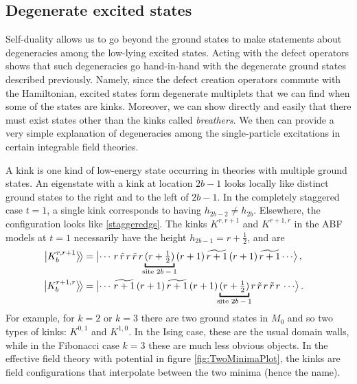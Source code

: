 \subsection{Degenerate excited states}

Self-duality allows us to go beyond the ground states to make statements about degeneracies among the low-lying excited states. Acting with the defect operators shows that such degeneracies go hand-in-hand with the degenerate ground states described previously.
Namely, since the defect creation operators commute with the Hamiltonian, excited states form degenerate multiplets that we can find when some of the states are kinks.
Moreover, we can show directly and easily that there must exist states other than the kinks called {\em breathers}.
We then can provide a very simple explanation of degeneracies among the single-particle excitations in certain integrable field theories.

A kink is one kind of low-energy state occurring in theories with multiple ground states.
An eigenstate with a kink at location $2b-1$ looks locally like distinct ground states to the right and to the left of $2b-1$.
In the completely staggered case $t=1$,  a single kink corresponds to having $h_{2b-2}\ne h_{2b}$. 
Elsewhere, the configuration looks like \eqref{staggeredgs}.
The kinks $K^{r,r+1}$ and $K^{r+1,r}$ in the ABF models at $t=1$ necessarily have the height $h_{2b-1}=r+\frac12$, and are
{\setmuskip{\medmuskip}{0mu}
\begin{align}
	\bigkett{K^{r,r+1}_b} &= \bigket{\cdots \, r \, \tilde{r} \, r \, \tilde{r} \, r \underbracket{ (r+\tfrac12) }_{\mkern-12mu\text{site $2b-1$}\mkern-12mu} \, (r+1) \, \widetilde{r+1} \, (r+1) \, \widetilde{r+1} \cdots} \,,
\cr
	\bigkett{K^{r+1,r}_b} &= \bigket{\cdots \, \widetilde{r+1} \, (r+1) \, \widetilde{r+1} \, (r+1) \underbracket{(r+\tfrac12)}_{\mkern-12mu\text{site $2b-1$}\mkern-12mu} r \, \tilde{r} \, r \, \tilde{r} \, r \, \cdots} \,.
\label{Kdef}
\end{align}}%
For example, for $k=2$ or $k=3$ there are two ground states in $M_0$ and so two types of kinks: $K^{0,1}$ and $K^{1,0}$.
In the Ising case, these are the usual domain walls, while in the Fibonacci case $k=3$ these are much less obvious objects.
In the effective field theory with potential in figure \ref{fig:TwoMinimaPlot}, the kinks are field configurations that interpolate between the two minima (hence the name). 



